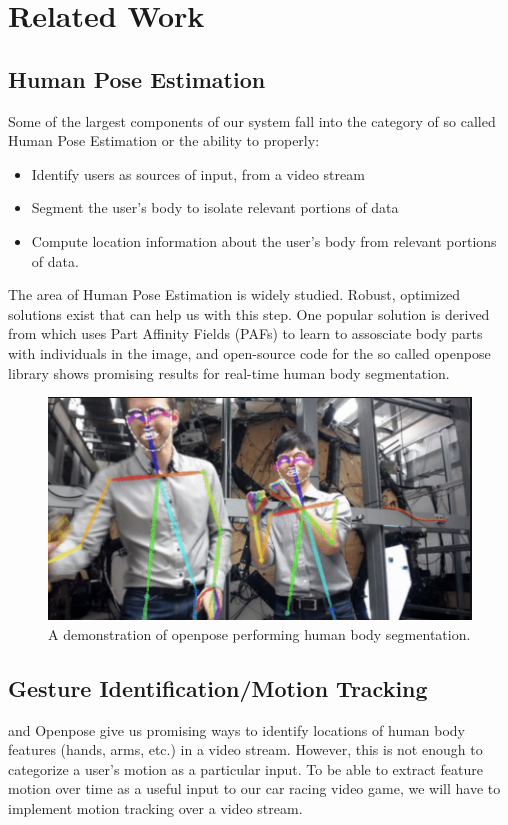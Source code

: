 \documentclass[10pt,twocolumn,letterpaper]{article}
\begin{document}
\section{Related Work}
\subsection{Human Pose Estimation}
Some of the largest components of our system fall into the category of so called Human 
Pose Estimation or the ability to properly:

\begin{itemize}
    \item Identify users as sources of input, from a video stream
    \item Segment the user's body to isolate relevant portions of data
    \item Compute location information about the user's body from relevant portions of data.
\end{itemize}

The area of Human Pose Estimation is widely studied. Robust, optimized solutions exist 
that can help us with this step. One popular solution is derived from \cite{8765346} which uses Part Affinity Fields (PAFs) to learn to assosciate body parts with individuals in the image, and 
open-source code for the so called openpose library shows promising results for real-time 
human body segmentation. 

\begin{figure}[h]
    \centering
    \includegraphics[width = .8\linewidth]{images/openpose.png}
    \caption{A demonstration of openpose performing human body segmentation.}
\end{figure}

\subsection{Gesture Identification/Motion Tracking}
\cite{8765346} and Openpose give us promising ways to identify locations of human body features 
(hands, arms, etc.) in a video stream. However, this is not enough to categorize a user's motion 
as a particular input. To be able to extract feature motion over time as a useful input to our 
car racing video game, we will have to implement motion tracking over a video stream. 
\end{document}
